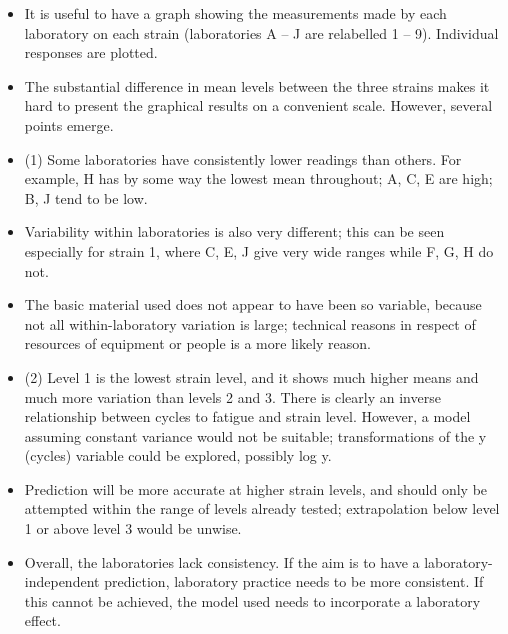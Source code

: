 \documentclass[a4paper,12pt]{article}
\begin{document}
\begin{itemize}
\item It is useful to have a graph showing the measurements made by each laboratory on each strain (laboratories A – J are relabelled 1 – 9). Individual responses are plotted.
\item The substantial difference in mean levels between the three strains makes it hard to present the graphical results on a convenient scale. However, several points emerge.
\item (1) Some laboratories have consistently lower readings than others. For example, H has by some way the lowest mean throughout; A, C, E are high; B, J tend to be low. 
\item Variability within laboratories is also very different; this can be seen especially for strain 1, where C, E, J give very wide ranges while F, G, H do not. 
\item The basic material used does not appear to have been so variable, because not all within-laboratory variation is large; technical reasons in respect of resources of equipment or people is a more likely reason.
\item (2) Level 1 is the lowest strain level, and it shows much higher means and much more variation than levels 2 and 3. There is clearly an inverse relationship between cycles to fatigue and strain level. However, a model assuming constant variance would not be suitable; transformations of the y (cycles) variable could be explored, possibly log y. 
\item Prediction will be more accurate at higher strain levels, and should only be attempted within the range of levels already tested; extrapolation below level 1 or above level 3 would be unwise.
\item Overall, the laboratories lack consistency. If the aim is to have a laboratory-independent prediction, laboratory practice needs to be more consistent. If this cannot be achieved, the model used needs to incorporate a laboratory effect.
 \end{itemize}
 
\end{document}
